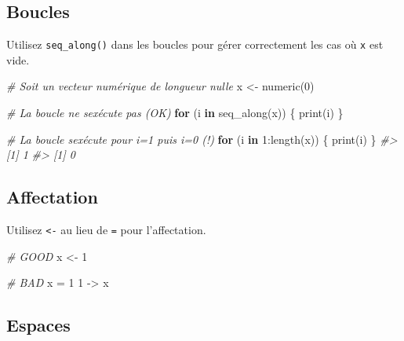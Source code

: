 \documentclass[
  french,
]{scrbook}
\newenvironment{Shaded}{\begin{snugshade}}{\end{snugshade}}
\newcommand{\CommentTok}[1]{\textcolor[rgb]{0.56,0.35,0.01}{\textit{#1}}}
\newcommand{\ControlFlowTok}[1]{\textcolor[rgb]{0.13,0.29,0.53}{\textbf{#1}}}
\newcommand{\DecValTok}[1]{\textcolor[rgb]{0.00,0.00,0.81}{#1}}
\newcommand{\FunctionTok}[1]{\textcolor[rgb]{0.00,0.00,0.00}{#1}}
\newcommand{\NormalTok}[1]{#1}
\newcommand{\OtherTok}[1]{\textcolor[rgb]{0.56,0.35,0.01}{#1}}
\newcommand{\SpecialCharTok}[1]{\textcolor[rgb]{0.00,0.00,0.00}{#1}}
\begin{document}
\hypertarget{boucles-1}{%
\subsection{Boucles}\label{boucles-1}}

Utilisez \texttt{seq\_along()} dans les boucles pour gérer correctement les cas où \texttt{x} est vide.

\begin{Shaded}
\begin{Highlighting}[]
\CommentTok{\# Soit un vecteur numérique de longueur nulle}
\NormalTok{x }\OtherTok{\textless{}{-}} \FunctionTok{numeric}\NormalTok{(}\DecValTok{0}\NormalTok{)}

\CommentTok{\# La boucle ne s\textquotesingle{}exécute pas (OK)}
\ControlFlowTok{for}\NormalTok{ (i }\ControlFlowTok{in} \FunctionTok{seq\_along}\NormalTok{(x)) \{}
  \FunctionTok{print}\NormalTok{(i)}
\NormalTok{\}}

\CommentTok{\# La boucle s\textquotesingle{}exécute pour i=1 puis i=0 (!)}
\ControlFlowTok{for}\NormalTok{ (i }\ControlFlowTok{in} \DecValTok{1}\SpecialCharTok{:}\FunctionTok{length}\NormalTok{(x)) \{}
  \FunctionTok{print}\NormalTok{(i)}
\NormalTok{\}}
\CommentTok{\#\textgreater{} [1] 1}
\CommentTok{\#\textgreater{} [1] 0}
\end{Highlighting}
\end{Shaded}

\hypertarget{affectation}{%
\subsection{Affectation}\label{affectation}}

Utilisez \texttt{\textless{}-} au lieu de \texttt{=} pour l'affectation.

\begin{Shaded}
\begin{Highlighting}[]
\CommentTok{\# GOOD}
\NormalTok{x }\OtherTok{\textless{}{-}} \DecValTok{1}

\CommentTok{\# BAD}
\NormalTok{x }\OtherTok{=} \DecValTok{1}
\DecValTok{1} \OtherTok{{-}\textgreater{}}\NormalTok{ x}
\end{Highlighting}
\end{Shaded}

\hypertarget{espaces}{%
\subsection{Espaces}\label{espaces}}
\end{document}
